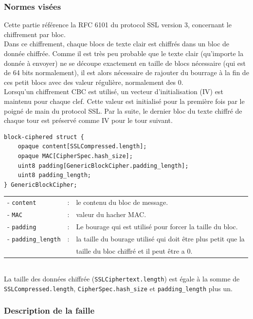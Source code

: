 \subsubsection{Normes visées}

Cette partie référence la RFC 6101 \cite{rfc6101} du protocol SSL version 3, concernant le chiffrement par bloc. \\
Dans ce chiffrement, chaque blocs de texte clair est chiffrés dans un bloc de donnée chiffrée. Comme il est très peu probable que le texte clair (qu'importe la donnée à envoyer) ne se découpe exactement en taille de blocs nécessaire (qui est de 64 bits normalement), il est alors nécessaire de rajouter du bourrage à la fin de ces petit blocs avec des valeur régulière, normalement des 0. \\

Lorsqu'un chiffrement CBC est utilisé, un vecteur d'initialisation (IV) est maintenu pour chaque clef. Cette valeur est initialisé pour la première fois par le poigné de main du protocol SSL. Par la suite, le dernier bloc du texte chiffré de chaque tour est préservé comme IV pour le tour suivant.\\
\newpage
\begin{verbatim} 
block-ciphered struct {
    opaque content[SSLCompressed.length];
    opaque MAC[CipherSpec.hash_size];
    uint8 padding[GenericBlockCipher.padding_length];
    uint8 padding_length;
} GenericBlockCipher;
\end{verbatim}

\begin{tabular}{llm{10cm}}
- \texttt{content}          & : & le contenu du bloc de message. \\
- \texttt{MAC}              & : & valeur du hacher MAC.\\
- \texttt{padding}          & : & Le bourage qui est utilisé pour forcer la taille du bloc.\\
- \texttt{padding\_length}  & : & la taille du bourage utilisé qui doit être plus petit que la \\
                            &   & taille du bloc chiffré et il peut être a 0.\\
\end{tabular}
\\

La taille des données chiffrée (\texttt{SSLCiphertext.length}) est égale à la somme de \texttt{SSLCompressed.length}, \texttt{CipherSpec.hash\_size} et \texttt{padding\_length} plus un.

\subsubsection{Description de la faille}

